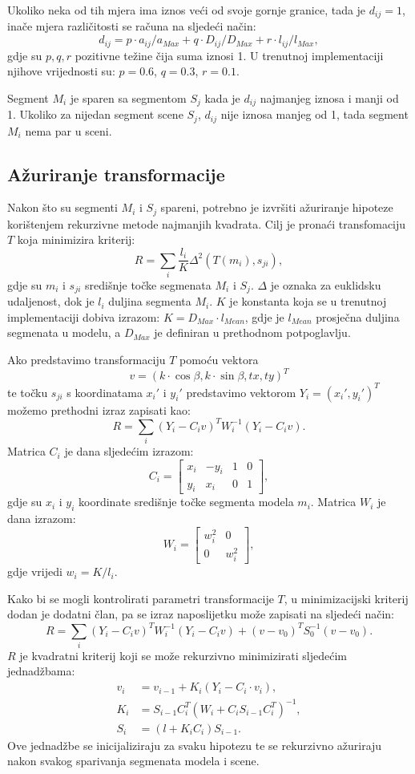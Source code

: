 \documentclass[lmodern, utf8, seminar, numeric]{fer}
\begin{document}
Ukoliko neka od tih mjera ima iznos veći od svoje gornje granice, tada je
$d_{ij}=1$, inače mjera različitosti se računa na sljedeći način:
\begin{equation}
d_{ij}=p\cdot a_{ij}/a_{Max}+q\cdot D_{ij}/D_{Max}+r\cdot l_{ij}/l_{Max},
\end{equation}
gdje su $p,q,r$ pozitivne težine čija suma iznosi 1. U trenutnoj implementaciji
njihove vrijednosti su: $p=0.6$, $q =0.3$, $r=0.1$.

Segment $M_i$ je sparen sa segmentom $S_j$ kada je $d_{ij}$ najmanjeg iznosa i
manji od 1. Ukoliko za nijedan segment scene $S_j$, $d_{ij}$ nije iznosa manjeg
od 1, tada segment $M_i$ nema par u sceni.


\subsection{Ažuriranje transformacije}
Nakon što su segmenti $M_i$ i $S_j$ spareni, potrebno je izvršiti ažuriranje
hipoteze korištenjem rekurzivne metode najmanjih kvadrata. Cilj je pronaći
transfomaciju $T$ koja minimizira kriterij:
$$R=\sum_i \frac{l_i}{K}\Delta^2(T(m_i),s_{ji}),$$
gdje su $m_i$ i $s_{ji}$ središnje točke segmenata $M_i$ i $S_j$. $\Delta$ je
oznaka za euklidsku udaljenost, dok je $l_i$ duljina segmenta $M_i$. $K$ je
konstanta koja se u trenutnoj implementaciji dobiva izrazom: $K = D_{Max}\cdot
l_{Mean}$, gdje je $l_{Mean}$ prosječna duljina segmenata u modelu, a $D_{Max}$
je definiran u prethodnom potpoglavlju.


Ako predstavimo transformaciju $T$ pomoću vektora
$$ v=(k\cdot  \cos\beta, k\cdot \sin\beta, tx,t y)^T$$
te točku $s_{ji}$  s koordinatama $x_i'$ i $y_i'$
predstavimo vektorom ${Y_i}=(x_i',y_i')^T$ možemo prethodni izraz zapisati
kao:
$$R=\sum_i({Y_i}-C_i v)^T W_i^{-1}({Y_i}-C_i v).$$
Matrica $C_i$ je dana sljedećim izrazom:
$$C_i = \left [ \begin{array}{cccc}
x_i & -y_i & 1 & 0\\
y_i & x_i & 0 & 1
\end{array} \right ],$$
gdje su $x_i$ i $y_i$ koordinate središnje točke segmenta modela $m_i$. Matrica $W_i$ je dana izrazom:
$$W_i = \left [ \begin{array}{cc}
w_i^2 & 0\\
0 & w_i^2
\end{array} \right ],$$
gdje vrijedi $w_i = K/l_i$.

Kako bi se mogli kontrolirati parametri transformacije $T$, u minimizacijski kriterij dodan je dodatni član, pa se izraz naposlijetku može zapisati na sljedeći način:
$$R=\sum_i({Y_i}-C_i v)^T W_i^{-1}({Y_i}-C_i v)+( v -  v_0)^T S_0^{-1}( v- v_0).$$
$R$ je kvadratni kriterij koji se može rekurzivno minimizirati sljedećim jednadžbama:
\begin{align*}
v_i & = v_{i-1}+K_i(Y_i-C_i\cdot v_i),\\
K_i & = S_{i-1}C_i^T(W_i+C_iS_{i-1}C_i^T)^{-1},\\
S_i & = (l+K_iC_i)S_{i-1}.
\end{align*}
Ove jednadžbe se inicijaliziraju za svaku hipotezu te se rekurzivno ažuriraju nakon svakog sparivanja segmenata modela i scene.
\end{document}
